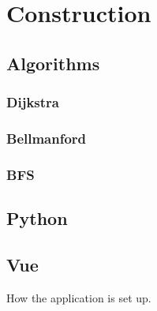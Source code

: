 \section{Construction}







\subsection{Algorithms}
\subsubsection{Dijkstra}
\subsubsection{Bellmanford}
\subsubsection{BFS}



\subsection{Python}

\subsection{Vue}
How the application is set up.

